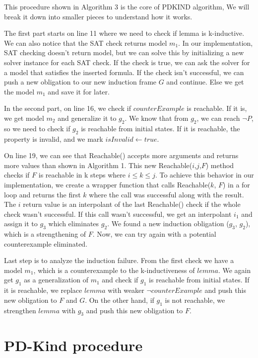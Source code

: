 \noindent This procedure shown in Algorithm 3 is the core of PDKIND algorithm, We will break it down into smaller pieces to understand how it works.

The first part starts on line 11 where we need to check if lemma is k-inductive. We can also notice that the SAT check returns model $m_1$. In our implementation, SAT checking doesn't return model, but we can solve this by initializing a new solver instance for each SAT check. If the check is true, we can ask the solver for a model that satisfies the inserted formula.
If the check isn't successful, we can push a new obligation to our new induction frame $G$ and continue. Else we get the model $m_1$ and save it for later.

In the second part, on line 16, we check if $counterExample$ is reachable. If it is, we get model $m_2$ and generalize it to $g_2$. We know that from $g_2$, we can reach $\neg P$, so we need to check if $g_2$ is reachable from initial states. If it is reachable, the property is invalid, and we mark $isInvalid \gets true$.

On line 19, we can see that Reachable() accepts more arguments and returns more values than shown in Algorithm 1. This new Reachable($i$,$j$,$F$) method checks if $F$ is reachable in k steps where $i\leq k \leq j$. To achieve this behavior in our implementation, we create a wrapper function that calls Reachable($k$, $F$) in a for loop and returns the first $k$ where the call was successful along with the result. The $i$ return value is an interpolant of the last Reachable() check if the whole check wasn't successful.
If this call wasn't successful, we get an interpolant $i_1$ and assign it to $g_3$ which eliminates $g_2$. We found a new induction obligation ($g_3$, $g_2$), which is a strengthening of $F$. Now, we can try again with a potential counterexample eliminated.

Last step is to analyze the induction failure. From the first check we have a model $m_1$, which is a counterexample to the k-inductiveness of $lemma$. We again get $g_1$ as a generalization of $m_1$ and check if $g_1$ is reachable from initial states. If it is reachable, we replace $lemma$ with weaker $\neg counterExample$ and push this new obligation to $F$ and $G$. On the other hand, if $g_1$ is not reachable, we strengthen $lemma$ with $g_3$ and push this new obligation to $F$.

\section{PD-Kind procedure}

